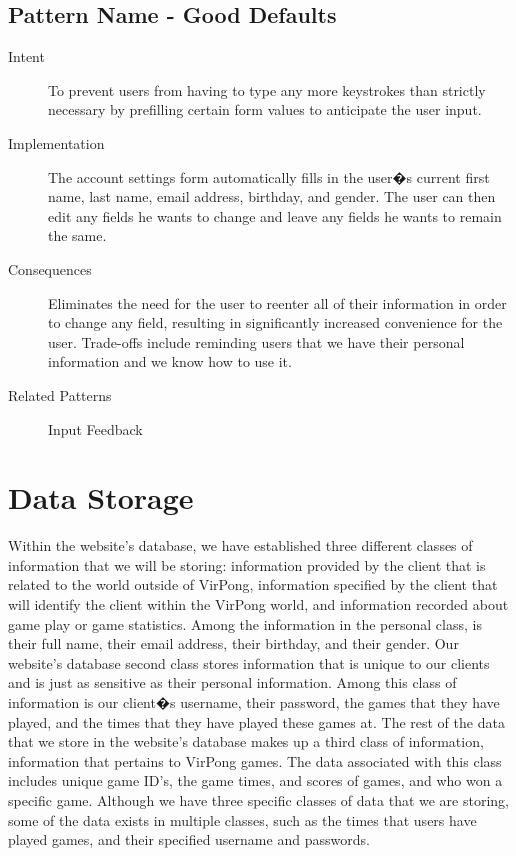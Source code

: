 \subsection{Pattern Name - Good Defaults}
\begin{description}
\item[Intent] To prevent users from having to type any more keystrokes than strictly necessary by prefilling certain form values to anticipate the user input.
\item[Implementation] The account settings form automatically fills in the user�s current first name, last name, email address, birthday, and gender. The user can then edit any fields he wants to change and leave any fields he wants to remain the same.
\item[Consequences] Eliminates the need for the user to reenter all of their information in order to change any field, resulting in significantly increased convenience for the user. Trade-offs include reminding users that we have their personal information and we know how to use it.
\item[Related Patterns] Input Feedback
\end{description}


	\section{Data Storage}
		Within the website's database, we have established three different classes of information that we will be storing: information provided by the client that is related to the world outside of VirPong, information specified by the client that will identify the client within the VirPong world, and information recorded about game play or game statistics. Among the information in the personal class, is their full name, their email address, their birthday, and their gender. Our website's database second class stores information that is unique to our clients and is just as sensitive as their personal information. Among this class of information is our client�s username, their password, the games that they have played, and the times that they have played these games at. The rest of the data that we store in the website's database makes up a third class of information, information that pertains to VirPong games. The data associated with this class includes unique game ID's, the game times, and scores of games, and who won a specific game. Although we have three specific classes of data that we are storing, some of the data exists in multiple classes, such as the times that users have played games, and their specified username and passwords.

